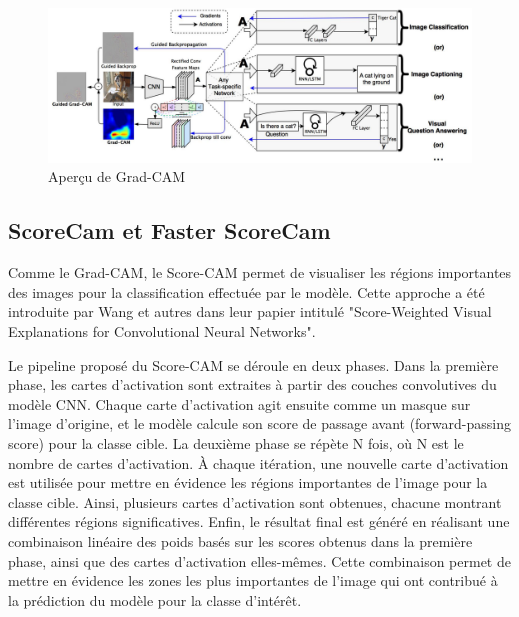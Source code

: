 \documentclass{report}
\begin{document}
{\begin{figure}[htbp] 
	\centering
        \includegraphics[width=16.5cm]{logo/Grad_cam.png} 
	\caption{Aperçu de Grad-CAM\cite{Selvaraju_2017_ICCV}}
	\label{fig:Aperçu de Grad-CAM}
\end{figure}
\newpage
\subsection{ScoreCam et Faster ScoreCam}
\label{sec:Score}
\hspace{1.6cm}Comme le Grad-CAM, le Score-CAM permet de visualiser les régions importantes des images pour la classification effectuée par le modèle. Cette approche a été introduite par Wang et autres dans leur papier intitulé "Score-Weighted Visual Explanations for Convolutional Neural Networks"\cite{Wang_2020_CVPR_Workshops}.
\vspace*{0.5\baselineskip}

\hspace{1.6cm}Le pipeline proposé du Score-CAM se déroule en deux phases. Dans la première phase, les cartes d'activation sont extraites à partir des couches convolutives du modèle CNN. Chaque carte d'activation agit ensuite comme un masque sur l'image d'origine, et le modèle calcule son score de passage avant (forward-passing score) pour la classe cible. La deuxième phase se répète N fois, où N est le nombre de cartes d'activation. À chaque itération, une nouvelle carte d'activation est utilisée pour mettre en évidence les régions importantes de l'image pour la classe cible. Ainsi, plusieurs cartes d'activation sont obtenues, chacune montrant différentes régions significatives. Enfin, le résultat final est généré en réalisant une combinaison linéaire des poids basés sur les scores obtenus dans la première phase, ainsi que des cartes d'activation elles-mêmes. Cette combinaison permet de mettre en évidence les zones les plus importantes de l'image qui ont contribué à la prédiction du modèle pour la classe d'intérêt.
\vspace*{0.5\baselineskip}

}
\end{document}
